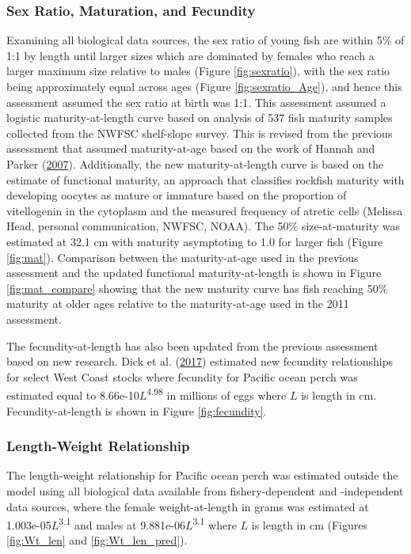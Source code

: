 \documentclass[12pt,]{article}
\begin{document}
\subsubsection{Sex Ratio, Maturation, and
Fecundity}\label{sex-ratio-maturation-and-fecundity}

Examining all biological data sources, the sex ratio of young fish are
within 5\% of 1:1 by length until larger sizes which are dominated by
females who reach a larger maximum size relative to males (Figure
\ref{fig:sexratio}), with the sex ratio being approximately equal across
ages (Figure \ref{fig:sexratio_Age}), and hence this assessment assumed
the sex ratio at birth was 1:1. This assessment assumed a logistic
maturity-at-length curve based on analysis of 537 fish maturity samples
collected from the NWFSC shelf-slope survey. This is revised from the
previous assessment that assumed maturity-at-age based on the work of
Hannah and Parker
(\protect\hyperlink{ref-hannah_age-modulated_2007}{2007}). Additionally,
the new maturity-at-length curve is based on the estimate of functional
maturity, an approach that classifies rockfish maturity with developing
oocytes as mature or immature based on the proportion of vitellogenin in
the cytoplasm and the measured frequency of atretic cells (Melissa Head,
personal communication, NWFSC, NOAA). The 50\% size-at-maturity was
estimated at 32.1 cm with maturity asymptoting to 1.0 for larger fish
(Figure \ref{fig:mat}). Comparison between the maturity-at-age used in
the previous assessment and the updated functional maturity-at-length is
shown in Figure \ref{fig:mat_compare} showing that the new maturity
curve has fish reaching 50\% maturity at older ages relative to the
maturity-at-age used in the 2011 assessment.

The fecundity-at-length has also been updated from the previous
assessment based on new research. Dick et al.
(\protect\hyperlink{ref-dick_meta-analysis_2017}{2017}) estimated new
fecundity relationships for select West Coast stocks where fecundity for
Pacific ocean perch was estimated equal to
8.66e-10\(L\)\textsuperscript{4.98} in millions of eggs where \(L\) is
length in cm. Fecundity-at-length is shown in Figure
\ref{fig:fecundity}.

\subsubsection{Length-Weight
Relationship}\label{length-weight-relationship}

The length-weight relationship for Pacific ocean perch was estimated
outside the model using all biological data available from
fishery-dependent and -independent data sources, where the female
weight-at-length in grams was estimated at
1.003e-05\(L\)\textsuperscript{3.1} and males at
9.881e-06\(L\)\textsuperscript{3.1} where \(L\) is length in cm (Figures
\ref{fig:Wt_len} and \ref{fig:Wt_len_pred}).
\end{document}
